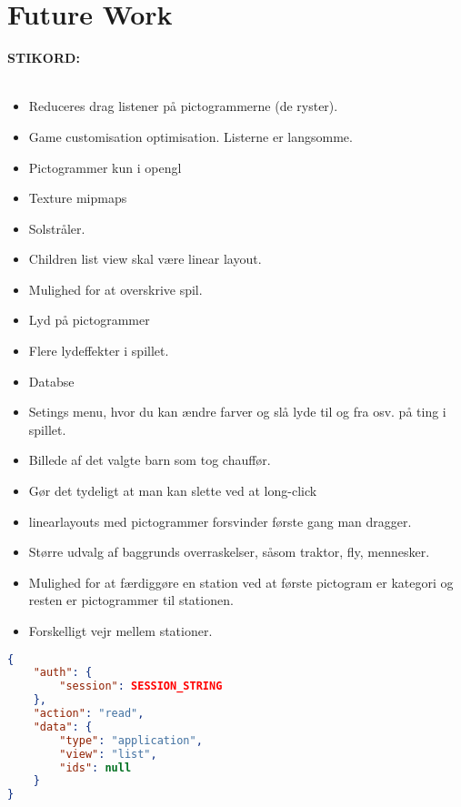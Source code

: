 \chapter{Future Work}

\textbf{STIKORD:}\\\\
\begin{itemize}
\item Reduceres drag listener på pictogrammerne (de ryster).
\item Game customisation optimisation. Listerne er langsomme.
\item Pictogrammer kun i opengl
\item Texture mipmaps
\item Solstråler.
\item Children list view skal være linear layout.
\item Mulighed for at overskrive spil.
\item Lyd på pictogrammer
\item Flere lydeffekter i spillet.
\item Databse 
\item Setings menu, hvor du kan ændre farver og slå lyde til og fra osv. på ting i spillet.
\item Billede af det valgte barn som tog chauffør.
\item Gør det tydeligt at man kan slette ved at long-click
\item linearlayouts med pictogrammer forsvinder første gang man dragger.
\item Større udvalg af baggrunds overraskelser, såsom traktor, fly, mennesker.
\item Mulighed for at færdiggøre en station ved at første pictogram er kategori og resten er pictogrammer til stationen.
\item Forskelligt vejr mellem stationer.

\end{itemize}
\begin{lstlisting}[language=json,firstnumber=1,caption={JSON guery to read application data},label=lst:jsonread]
{
	"auth": {
		"session": SESSION_STRING
	},
	"action": "read",
	"data": {
		"type": "application",
		"view": "list",
		"ids": null
	}
}
\end{lstlisting} 
